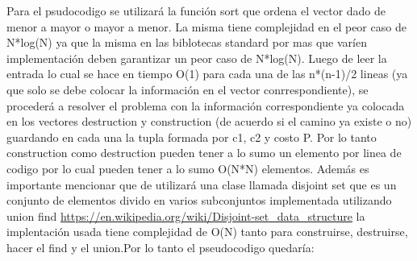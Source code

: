 Para el psudocodigo se utilizará la función sort que ordena el vector dado de menor a mayor o mayor a menor. La misma tiene complejidad en el peor caso de N*log(N) ya que la misma en las biblotecas standard por mas que varíen implementación deben garantizar un peor caso de N*log(N). Luego de leer la entrada lo cual se hace en tiempo O(1) para cada una de las n*(n-1)/2 lineas (ya que solo se debe colocar la información en el vector conrrespondiente), se procederá a resolver el problema con la información correspondiente ya colocada en los vectores destruction y construction (de acuerdo si el camino ya existe o no) guardando en cada una la tupla formada por c1, c2 y costo P. Por lo tanto construction como destruction pueden tener a lo sumo un elemento por linea de codigo por lo cual pueden tener a lo sumo O(N*N) elementos. Además es importante mencionar que de utilizará una clase llamada disjoint set que es un conjunto de elementos divido en varios subconjuntos implementada utilizando union find \url{https://en.wikipedia.org/wiki/Disjoint-set_data_structure} la implentación usada tiene complejidad de O(N) tanto para construirse, destruirse, hacer el find y el union.Por lo tanto el pseudocodigo quedaría:





